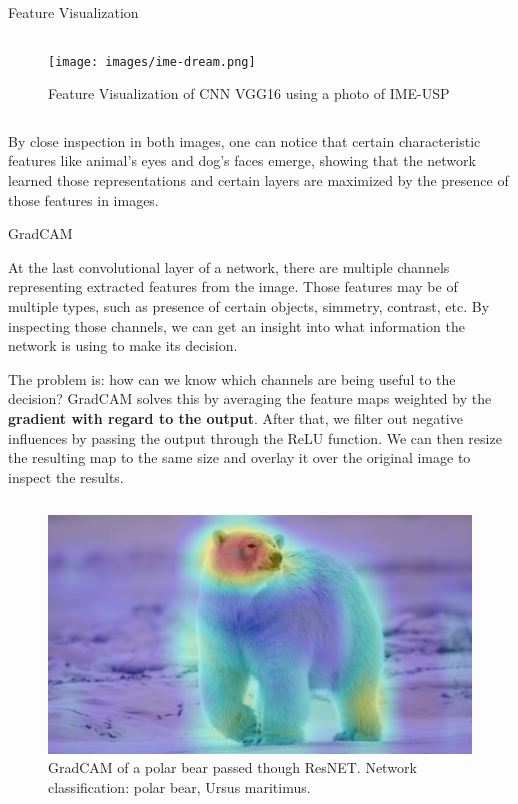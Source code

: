 \documentclass[final]{beamer}
\newlength{\colwidth}
\begin{document}
\begin{frame}[t]
\begin{columns}[t]
\begin{column}{\colwidth}
\begin{block}{Feature Visualization}
\begin{columns}
      \begin{column}{0.5\textwidth}
        \begin{figure}
          \centering
          \texttt{[image: images/ime-dream.png]}
          \caption{Feature Visualization of CNN VGG16 using a photo of IME-USP}
        \end{figure}
      \end{column}
      
    \end{columns}

    By close inspection in both images, one can notice that certain characteristic features like animal's eyes and dog's faces emerge,
    showing that the network learned those representations and certain layers are maximized by the presence of those features in images.
  \end{block}

  \begin{block}{GradCAM}

    At the last convolutional layer of a network, there are multiple channels representing extracted features from the image. Those features may be of multiple types, such as presence of certain objects, simmetry, contrast, etc. By inspecting those channels, we can get an insight into what information the network is using to make its decision.

    The problem is: how can we know which channels are being useful to the decision? GradCAM solves this by averaging the feature maps weighted by the \textbf{gradient with regard to the output}. After that, we filter out negative influences by passing the output through the ReLU function. We can then resize the resulting map to the same size and overlay it over the original image to inspect the results.
    
    \begin{columns}  
      \begin{column}{0.5\textwidth}
        \begin{figure}
          \centering
          \includegraphics[width=0.9\linewidth]{images/GC_ursopolar.png}
          \caption{GradCAM of a polar bear passed though ResNET. Network classification: polar bear, Ursus maritimus.}
        \end{figure}  
      \end{column}


\end{columns}
\end{block}
\end{column}
\end{columns}
\end{frame}
\end{document}
